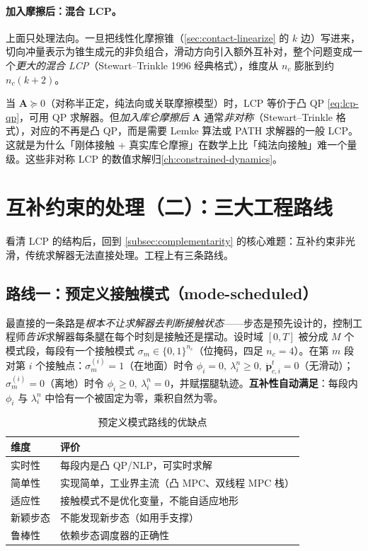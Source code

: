 \paragraph{加入摩擦后：混合 LCP。}
上面只处理法向。一旦把线性化摩擦锥（\cref{sec:contact-linearize} 的 $k$ 边）写进来，切向冲量表示为锥生成元的非负组合，滑动方向引入额外互补对，整个问题变成一个\emph{更大的混合 LCP}（Stewart--Trinkle 1996 经典格式\cite{stewart1996implicit}），维度从 $n_c$ 膨胀到约 $n_c(k+2)$。

\begin{pitfall}
当 $\mathbf{A}\succeq0$（对称半正定，纯法向或关联摩擦模型）时，LCP 等价于凸 QP \cref{eq:lcp-qp}，可用 QP 求解器。但\emph{加入库仑摩擦后} $\mathbf{A}$ 通常\emph{非对称}（Stewart--Trinkle 格式），对应的不再是凸 QP，而是需要 Lemke 算法或 PATH 求解器的一般 LCP。这就是为什么「刚体接触 + 真实库仑摩擦」在数学上比「纯法向接触」难一个量级。这些非对称 LCP 的数值求解归\cref{ch:constrained-dynamics}。
\end{pitfall}

\section{互补约束的处理（二）：三大工程路线}
\label{sec:contact-routes}

看清 LCP 的结构后，回到 \cref{subsec:complementarity} 的核心难题：互补约束非光滑，传统求解器无法直接处理。工程上有三条路线。

\subsection{路线一：预定义接触模式（mode-scheduled）}
\label{subsec:route-mode}

最直接的一条路是\emph{根本不让求解器去判断接触状态}——步态是预先设计的，控制工程师\emph{告诉}求解器每条腿在每个时刻是接触还是摆动。设时域 $[0,T]$ 被分成 $M$ 个模式段，每段有一个接触模式 $\sigma_m\in\{0,1\}^{n_c}$（位掩码，四足 $n_c=4$）。在第 $m$ 段对第 $i$ 个接触点：$\sigma_m^{(i)}=1$（在地面）时令 $\phi_i=0,\ \lambda_i^n\ge0,\ \dot{\boldsymbol{p}}_{c,i}^t=0$（无滑动）；$\sigma_m^{(i)}=0$（离地）时令 $\phi_i\ge0,\ \lambda_i^n=0$，并赋摆腿轨迹。\textbf{互补性自动满足}：每段内 $\phi_i$ 与 $\lambda_i^n$ 中恰有一个被固定为零，乘积自然为零。

\begin{table}[H]\centering\small
\caption{预定义模式路线的优缺点}
\label{tab:route-mode}
\begin{tabular}{ll}
\toprule
维度 & 评价 \\
\midrule
实时性 & 每段内是凸 QP/NLP，可实时求解 \\
简单性 & 实现简单，工业界主流（凸 MPC、双线程 MPC 栈） \\
适应性 & 接触模式不是优化变量，不能自适应地形 \\
新颖步态 & 不能发现新步态（如用手支撑） \\
鲁棒性 & 依赖步态调度器的正确性 \\
\bottomrule
\end{tabular}
\end{table}


